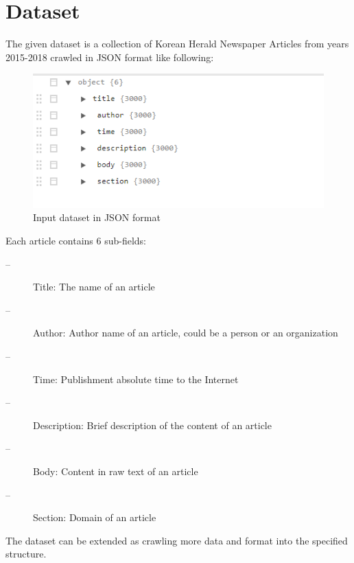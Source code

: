 \section{Dataset}
The given dataset is  a collection of Korean Herald Newspaper Articles from years 2015-2018 crawled in JSON format like following:
\begin{figure}[h]
\centering
\includegraphics[scale= 0.7]{dataset.png}
\caption{Input dataset in JSON format}
\end{figure}
Each article contains 6 sub-fields:
\begin{description}
\item[-- ]Title: The name of an article
\item[-- ]Author: Author name of an article, could be a person or an organization
\item[-- ]Time: Publishment absolute time to the Internet
\item[-- ]Description: Brief description of the content of an article
\item[-- ]Body: Content in raw text of an article
\item[-- ]Section: Domain of an article 
\end{description}
The dataset can be extended as crawling more data and format into the specified structure.
